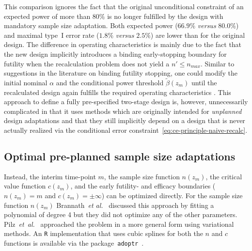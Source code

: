 \documentclass[12pt]{article}
\begin{document}
This comparison ignores the fact that
the original unconditional constraint of an expected power of more than $80\%$
is no longer fulfilled by the design with mandatory
sample size adaptation.
Both expected power ($66.9\%$ \emph{versus} $80.0\%$) and maximal type~I error rate ($1.8\%$ \emph{versus} $2.5\%$) are lower than for the original design.
The difference in operating characteristics is mainly due to the fact
that the new design implicitly introduces a binding early-stopping boundary for futility
when the recalculation problem does not yield a $n'\leq n_{max}$.
Similar to suggestions in the literature on binding futility stopping,
one could modify the initial nominal $\alpha$ and the conditional power threshold $\widetilde{\beta}(z_m)$ until the recalculated design again fulfills the required
operating characteristics \cite{brannath2004}.
This approach to define a fully pre-specified two-stage design is, however, unnecessarily complicated in that it
uses methods which are originally intended for \emph{unplanned}
design adaptations and that
they still implicitly depend on a design that is never actually realized via the
conditional error constraint~\eqref{eq:ce-principle-naive-recalc}.



\subsection{Optimal pre-planned sample size adaptations}
\label{sec:optimal-adaptation}

Instead, the interim time-point $m$,
the sample size function $n(z_m)$,
the critical value function $c(z_m)$,
and the early futility- and efficacy boundaries
($n(z_m)=m$ and $ c(z_m)=\pm\infty$)
can be optimized directly.
For the sample size function $n(z_m)$ Brannath~\textit{et al.}~\cite{brannath2004} discussed this approach by fitting a polynomial of degree 4 but they did not optimize
any of the other parameters.
Pilz~\textit{et~al.}~\cite{pilz2019} approached the problem in a more general form using
variational methods.
An \texttt{R} implementation that uses cubic splines for both the $n$ and
$c$ functions is available via the package~\texttt{adoptr}~\cite{adoptrjss2020}.
\end{document}
